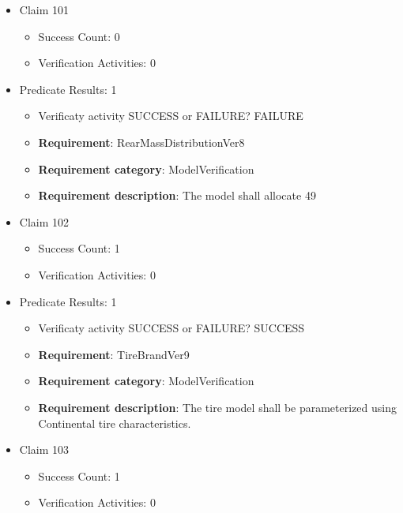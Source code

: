 \documentclass{article}
\begin{document}
\begin{itemize}
  				  \item Claim 101
				\begin{itemize}
			    	\item Success Count: 0 
			    	\item Verification Activities: 0
				\end{itemize}
				
									    
				\item Predicate Results: 1
					\begin{itemize}				
					\item Verificaty activity SUCCESS or FAILURE? FAILURE
					
					\item \textbf{Requirement}: RearMassDistributionVer8 
					\item \textbf{Requirement category}: ModelVerification
					\item \textbf{Requirement description}: The model shall allocate 49%
					\end{itemize}

  				  \item Claim 102
				\begin{itemize}
			    	\item Success Count: 1 
			    	\item Verification Activities: 0
				\end{itemize}
				
									    
				\item Predicate Results: 1
					\begin{itemize}				
					\item Verificaty activity SUCCESS or FAILURE? SUCCESS
					
					\item \textbf{Requirement}: TireBrandVer9 
					\item \textbf{Requirement category}: ModelVerification
					\item \textbf{Requirement description}: The tire model shall be parameterized using Continental tire characteristics.
					\end{itemize}

  				  \item Claim 103
				\begin{itemize}
			    	\item Success Count: 1 
			    	\item Verification Activities: 0
				\end{itemize}
				

\end{itemize}
\end{document}
